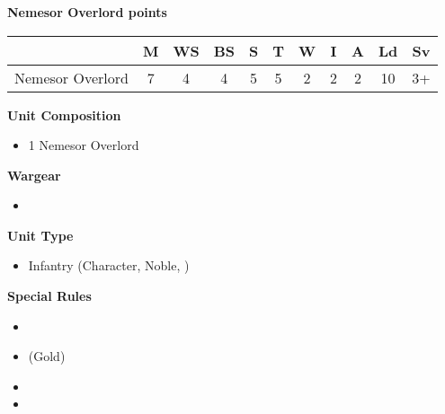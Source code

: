 \newpage
\subsubsection[Nemesor Overlord]{}

\hspace{0.5em}
\begin{minipage}[t]{0.72\textwidth}
	{\large \textbf{Nemesor Overlord  points}}
	
	\begin{tabular}{m{165 pt} *{10}{c}}
		& M & WS & BS & S & T & W & I & A & Ld & Sv \\
		\hline
		Nemesor Overlord & 7 & 4 & 4 & 5 & 5 & 2 & 2 & 2 & 10 & 3+ \\
	\end{tabular}
	\small
	\begin{minipage}{0.5\textwidth}
		\vspace*{2em}
		\textbf{Unit Composition}
		\begin{itemize}
			\item 1 Nemesor Overlord
		\end{itemize}
		
		\textbf{Wargear}
		\begin{itemize}
			\item {}
		\end{itemize}
	\end{minipage}
	\begin{minipage}{0.5\textwidth}
		\vspace*{2em}
		\textbf{Unit Type}
		\begin{itemize}
			\item Infantry (Character, Noble, )
		\end{itemize}
		
		\textbf{Special Rules}
		\begin{itemize}
			\item {}
			\item {} (Gold)
			\item {}
			\item {}
		\end{itemize}
	\end{minipage}
	

\end{minipage}
